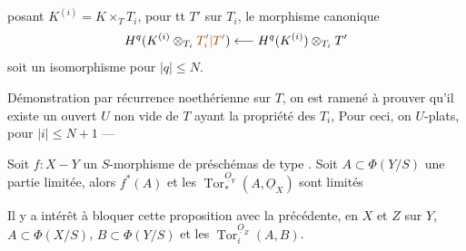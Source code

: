  posant $K^{(i)}=K\times_T T_i$, pour tt $T'$ sur $T_i$, le morphisme canonique
\[
H^q(K^{(i)}\otimes_{T_i}\unsure{T'_i|T'})\longleftarrow H^q(K^{(i)})\otimes_{T_i}T'
\]
soit un isomorphisme pour $|q|\leq N$.

Démonstration par récurrence noethérienne sur $T$, on est ramené à prouver qu'il existe un ouvert $U$ non vide de $T$ ayant la propriété des $T_i$,  Pour ceci, on      $U$-plats, pour $|i|\leq N+1$ ---


Soit $f:X-Y$ un $S$-morphisme de préschémas de type . Soit $A\subset\Phi(Y/S)$ une partie limitée, alors $f^*(A)$ et les $\operatorname{Tor}^{\underline O_Y}_{*}(A,\underline O_X)$ sont limités

Il y a intérêt à bloquer cette proposition avec la précédente, en   $X$ et $Z$ sur $Y$,  $A\subset\Phi(X/S)$, $B\subset\Phi(Y/S)$ et les $\operatorname{Tor}_i^{\underline O_Z}(A,B)$.
